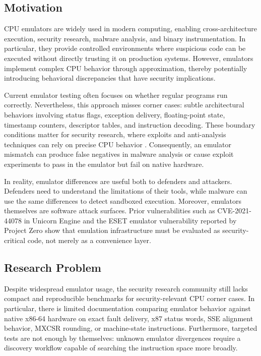 
\subsection{Motivation}

CPU emulators are widely used in modern computing, enabling cross-architecture execution, security research, malware analysis, and binary instrumentation. In particular, they provide controlled environments where suspicious code can be executed without directly trusting it on production systems. However, emulators implement complex CPU behavior through approximation, thereby potentially introducing behavioral discrepancies that have security implications.

Current emulator testing often focuses on whether regular programs run correctly. Nevertheless, this approach misses corner cases: subtle architectural behaviors involving status flags, exception delivery, floating-point state, timestamp counters, descriptor tables, and instruction decoding. These boundary conditions matter for security research, where exploits and anti-analysis techniques can rely on precise CPU behavior \cite{chen2018anti}. Consequently, an emulator mismatch can produce false negatives in malware analysis or cause exploit experiments to pass in the emulator but fail on native hardware.

In reality, emulator differences are useful both to defenders and attackers. Defenders need to understand the limitations of their tools, while malware can use the same differences to detect sandboxed execution. Moreover, emulators themselves are software attack surfaces. Prior vulnerabilities such as CVE-2021-44078 in Unicorn Engine \cite{cve2021-44078} and the ESET emulator vulnerability reported by Project Zero \cite{ormandy2015eset} show that emulation infrastructure must be evaluated as security-critical code, not merely as a convenience layer.

\subsection{Research Problem}

Despite widespread emulator usage, the security research community still lacks compact and reproducible benchmarks for security-relevant CPU corner cases. In particular, there is limited documentation comparing emulator behavior against native x86-64 hardware on exact fault delivery, x87 status words, SSE alignment behavior, MXCSR rounding, or machine-state instructions. Furthermore, targeted tests are not enough by themselves: unknown emulator divergences require a discovery workflow capable of searching the instruction space more broadly.

